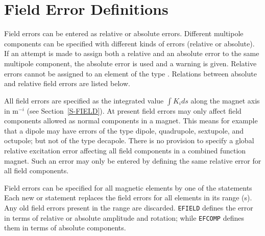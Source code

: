 \section{Field Error Definitions}
\label{S-FIELDEF}
Field errors can be entered as relative or absolute errors.
Different multipole components can be specified with
different kinds of errors (relative or absolute).
If an attempt is made to assign both a relative
and an absolute error to the same multipole component,
the absolute error is used and a warning is given.
Relative errors cannot be assigned to an element of the type
.
Relations between absolute and relative field errors are listed
below.
\par All field errors are specified as the integrated value
\(\int K_{i}ds\) along the magnet axis in \(\mathrm{m}^{-i}\)
(see Section~\ref{S-FIELD}).
At present field errors may only affect field components
allowed as normal components in a magnet.
This means for example that a dipole may have errors of the type dipole,
quadrupole, sextupole, and octupole; but not of the type decapole.
There is no provision to specify a global relative
excitation error affecting all field components in a combined function
magnet.
Such an error may only be entered by defining the same relative error
for all field components.
\par Field errors can be specified for all magnetic elements
by one of the statements
Each new  or  statement replaces the
field errors for all elements in its range (s).
Any old field errors present in the range are discarded.
{\tt EFIELD} defines the error in terms of relative or absolute amplitude
and rotation;
while {\tt EFCOMP} defines them in terms of absolute components.
 
